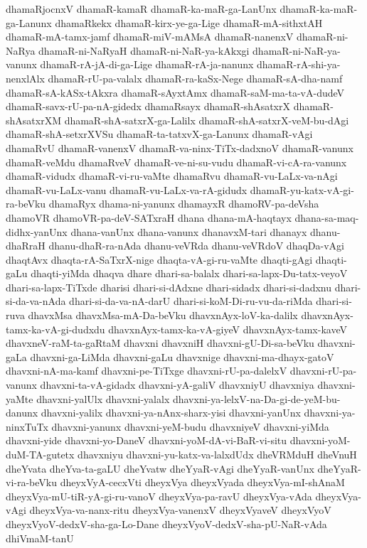 {dhamaRjocnxV
dhamaR-kamaR
dhamaR-ka-maR-ga-LanUnx
dhamaR-ka-maR-ga-Lanunx
dhamaRkekx
dhamaR-kirx-ye-ga-Lige
dhamaR-mA-sithxtAH
dhamaR-mA-tamx-jamf
dhamaR-miV-mAMsA
dhamaR-nanenxV
dhamaR-ni-NaRya
dhamaR-ni-NaRyaH
dhamaR-ni-NaR-ya-kAkxgi
dhamaR-ni-NaR-ya-vanunx
dhamaR-rA-jA-di-ga-Lige
dhamaR-rA-ja-nanunx
dhamaR-rA-shi-ya-nenxlAlx
dhamaR-rU-pa-valalx
dhamaR-ra-kaSx-Nege
dhamaR-sA-dha-namf
dhamaR-sA-kASx-tAkxra
dhamaR-sAyxtAmx
dhamaR-saM-ma-ta-vA-dudeV
dhamaR-savx-rU-pa-nA-gidedx
dhamaRsayx
dhamaR-shAsatxrX
dhamaR-shAsatxrXM
dhamaR-shA-satxrX-ga-Lalilx
dhamaR-shA-satxrX-veM-bu-dAgi
dhamaR-shA-setxrXVSu
dhamaR-ta-tatxvX-ga-Lanunx
dhamaR-vAgi
dhamaRvU
dhamaR-vanenxV
dhamaR-va-ninx-TiTx-dadxnoV
dhamaR-vanunx
dhamaR-veMdu
dhamaRveV
dhamaR-ve-ni-su-vudu
dhamaR-vi-cA-ra-vanunx
dhamaR-vidudx
dhamaR-vi-ru-vaMte
dhamaRvu
dhamaR-vu-LaLx-va-nAgi
dhamaR-vu-LaLx-vanu
dhamaR-vu-LaLx-va-rA-gidudx
dhamaR-yu-katx-vA-gi-ra-beVku
dhamaRyx
dhama-ni-yanunx
dhamayxR
dhamoRV-pa-deVsha
dhamoVR
dhamoVR-pa-deV-SATxraH
dhana
dhana-mA-haqtayx
dhana-sa-maq-didhx-yanUnx
dhana-vanUnx
dhana-vanunx
dhanavxM-tari
dhanayx
dhanu-dhaRraH
dhanu-dhaR-ra-nAda
dhanu-veVRda
dhanu-veVRdoV
dhaqDa-vAgi
dhaqtAvx
dhaqta-rA-SaTxrX-nige
dhaqta-vA-gi-ru-vaMte
dhaqti-gAgi
dhaqti-gaLu
dhaqti-yiMda
dhaqva
dhare
dhari-sa-balalx
dhari-sa-lapx-Du-tatx-veyoV
dhari-sa-lapx-TiTxde
dharisi
dhari-si-dAdxne
dhari-sidadx
dhari-si-dadxnu
dhari-si-da-va-nAda
dhari-si-da-va-nA-darU
dhari-si-koM-Di-ru-vu-da-riMda
dhari-si-ruva
dhavxMsa
dhavxMsa-mA-Da-beVku
dhavxnAyx-loV-ka-dalilx
dhavxnAyx-tamx-ka-vA-gi-dudxdu
dhavxnAyx-tamx-ka-vA-giyeV
dhavxnAyx-tamx-kaveV
dhavxneV-raM-ta-gaRtaM
dhavxni
dhavxniH
dhavxni-gU-Di-sa-beVku
dhavxni-gaLa
dhavxni-ga-LiMda
dhavxni-gaLu
dhavxnige
dhavxni-ma-dhayx-gatoV
dhavxni-nA-ma-kamf
dhavxni-pe-TiTxge
dhavxni-rU-pa-dalelxV
dhavxni-rU-pa-vanunx
dhavxni-ta-vA-gidadx
dhavxni-yA-galiV
dhavxniyU
dhavxniya
dhavxni-yaMte
dhavxni-yalUlx
dhavxni-yalalx
dhavxni-ya-lelxV-na-Da-gi-de-yeM-bu-danunx
dhavxni-yalilx
dhavxni-ya-nAnx-sharx-yisi
dhavxni-yanUnx
dhavxni-ya-ninxTuTx
dhavxni-yanunx
dhavxni-yeM-budu
dhavxniyeV
dhavxni-yiMda
dhavxni-yide
dhavxni-yo-DaneV
dhavxni-yoM-dA-vi-BaR-vi-situ
dhavxni-yoM-duM-TA-gutetx
dhavxniyu
dhavxni-yu-katx-va-lalxdUdx
dheVRMduH
dheVnuH
dheYvata
dheYva-ta-gaLU
dheYvatw
dheYyaR-vAgi
dheYyaR-vanUnx
dheYyaR-vi-ra-beVku
dheyxVyA-cecxVti
dheyxVya
dheyxVyada
dheyxVya-mI-shAnaM
dheyxVya-mU-tiR-yA-gi-ru-vanoV
dheyxVya-pa-ravU
dheyxVya-vAda
dheyxVya-vAgi
dheyxVya-va-nanx-ritu
dheyxVya-vanenxV
dheyxVyaveV
dheyxVyoV
dheyxVyoV-dedxV-sha-ga-Lo-Dane
dheyxVyoV-dedxV-sha-pU-NaR-vAda
dhiVmaM-tanU
}
